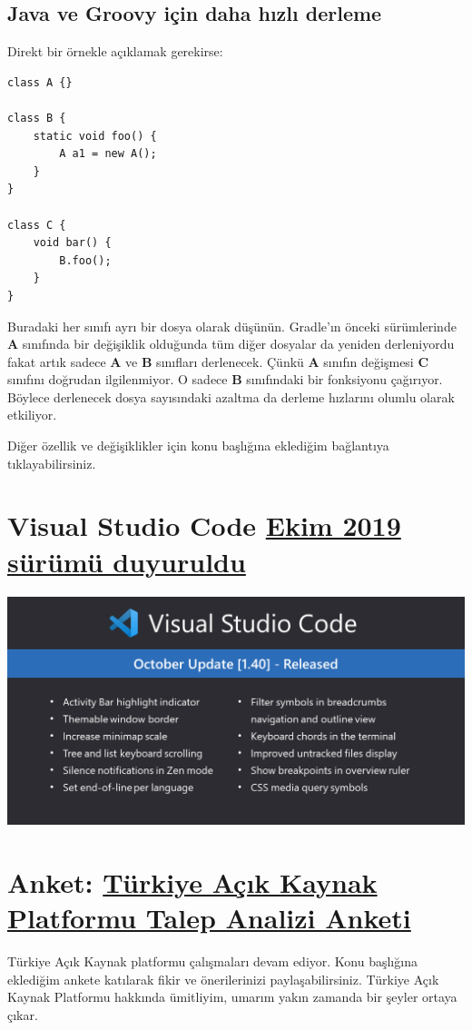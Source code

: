 \documentclass[11pt]{article}
\begin{document}
\subsection{Java ve Groovy için daha hızlı derleme}
\label{sec:orgb332e88}
Direkt bir örnekle açıklamak gerekirse:
\begin{verbatim}
class A {}

class B {
    static void foo() {
        A a1 = new A();
    }
}

class C {
    void bar() {
        B.foo();
    }
}
\end{verbatim}
Buradaki her sınıfı ayrı bir dosya olarak düşünün. Gradle'ın önceki
sürümlerinde \textbf{A} sınıfında bir değişiklik olduğunda tüm diğer dosyalar da
yeniden derleniyordu fakat artık sadece \textbf{A} ve \textbf{B} sınıfları derlenecek.
Çünkü \textbf{A} sınıfın değişmesi \textbf{C} sınıfını doğrudan ilgilenmiyor. O sadece \textbf{B}
sınıfındaki bir fonksiyonu çağırıyor. Böylece derlenecek dosya sayısındaki
azaltma da derleme hızlarını olumlu olarak etkiliyor.

Diğer özellik ve değişiklikler için konu başlığına eklediğim bağlantıya
tıklayabilirsiniz.
\section{Visual Studio Code \href{https://code.visualstudio.com/updates/v1\_40}{Ekim 2019 sürümü duyuruldu}}
\label{sec:orgbe7fc2e}
\begin{center}
\includegraphics[width=.9\linewidth]{gorseller/vscode1-40.png}
\end{center}
\section{Anket: \href{https://docs.google.com/forms/d/e/1FAIpQLScDKFrhI4SeTuRtokSNYrdSrNKdM8zmHkPyNfMxIG3PgXnQNg/viewform}{Türkiye Açık Kaynak Platformu Talep Analizi Anketi}}
\label{sec:org9a54700}
Türkiye Açık Kaynak platformu çalışmaları devam ediyor. Konu başlığına
eklediğim ankete katılarak fikir ve önerilerinizi paylaşabilirsiniz. Türkiye
Açık Kaynak Platformu hakkında ümitliyim, umarım yakın zamanda bir şeyler
ortaya çıkar.
\end{document}
